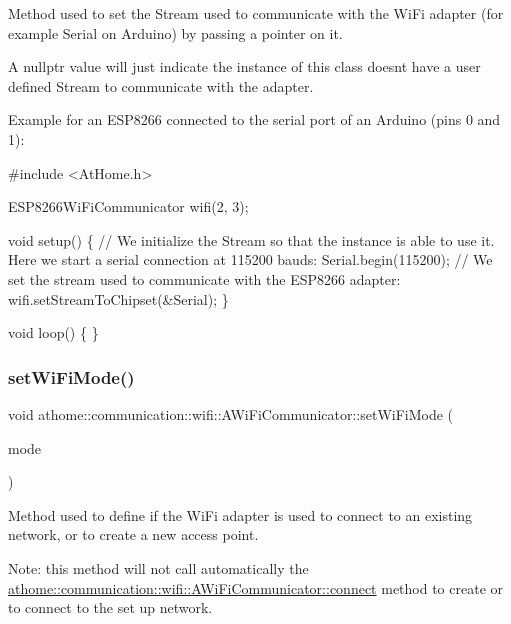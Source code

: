 Method used to set the Stream used to communicate with the Wi\+Fi adapter (for example Serial on Arduino) by passing a pointer on it.

A {\ttfamily nullptr} value will just indicate the instance of this class doesn\textquotesingle{}t have a user defined Stream to communicate with the adapter.

Example for an E\+S\+P8266 connected to the serial port of an Arduino (pins 0 and 1)\+:


\begin{DoxyCode}
\textcolor{preprocessor}{#include <AtHome.h>}

ESP8266WiFiCommunicator wifi(2, 3);

\textcolor{keywordtype}{void} setup() \{
  \textcolor{comment}{// We initialize the Stream so that the instance is able to use it. Here}
we start a serial connection at 115200 bauds: Serial.begin(115200);
  \textcolor{comment}{// We set the stream used to communicate with the ESP8266 adapter:}
  wifi.setStreamToChipset(&Serial);
\}

\textcolor{keywordtype}{void} loop() \{
\}
\end{DoxyCode}
 \mbox{\label{classathome_1_1communication_1_1wifi_1_1_a_wi_fi_communicator_a28538cf510da8b59056b2533a6e53bcc}} 
\subsubsection{\texorpdfstring{set\+Wi\+Fi\+Mode()}{setWiFiMode()}}
{\footnotesize\ttfamily void athome\+::communication\+::wifi\+::\+A\+Wi\+Fi\+Communicator\+::set\+Wi\+Fi\+Mode (\begin{DoxyParamCaption}\item[{wifi\+\_\+mode}]{mode }\end{DoxyParamCaption})}

Method used to define if the Wi\+Fi adapter is used to connect to an existing network, or to create a new access point.

Note\+: this method will not call automatically the \mbox{\hyperlink{classathome_1_1communication_1_1wifi_1_1_a_wi_fi_communicator_a309927109fbc19aa0fb2afb71d50bbf9}{athome\+::communication\+::wifi\+::\+A\+Wi\+Fi\+Communicator\+::connect}} method to create or to connect to the set up network.

